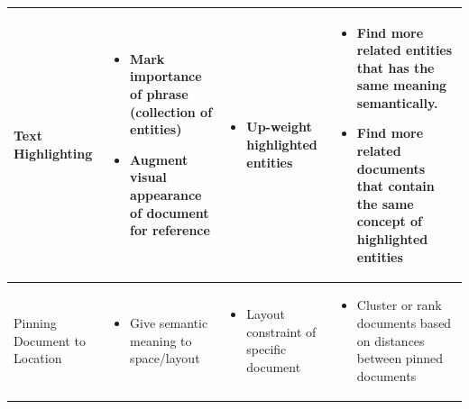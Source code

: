 \documentclass[journal]{vgtc}                %
\begin{document}
\begin{table}[t]
\begin{tabular}{| m{2.5cm} | m{4.5cm} | m{4.5cm} | m{4.5cm} |}
Text Highlighting & \begin{itemize} [leftmargin=.1in]
                                 \item Mark importance of phrase (collection of entities)
                                 \item Augment visual appearance of document for reference
                               \end{itemize}
                  & \begin{itemize} [leftmargin=.1in]
                                 \item Up-weight highlighted entities
                               \end{itemize}
                  & \begin{itemize}[leftmargin=.1in]
                                 \item  Find more related entities that has the same meaning semantically.
                                 \item  Find more related documents that contain the same concept of highlighted entities
                               \end{itemize} \\ \hline

Pinning Document to Location & \begin{itemize} [leftmargin=.1in]
                                    \item Give semantic meaning to space/layout
                               \end{itemize}
                             &  \begin{itemize} [leftmargin=.1in]
                                    \item Layout constraint of specific document
                               \end{itemize}
                             & \begin{itemize} [leftmargin=.1in]
                                    \item Cluster or rank documents based on distances between pinned documents
                               \end{itemize} \\ \hline


\end{tabular}
\end{table}
\end{document}

